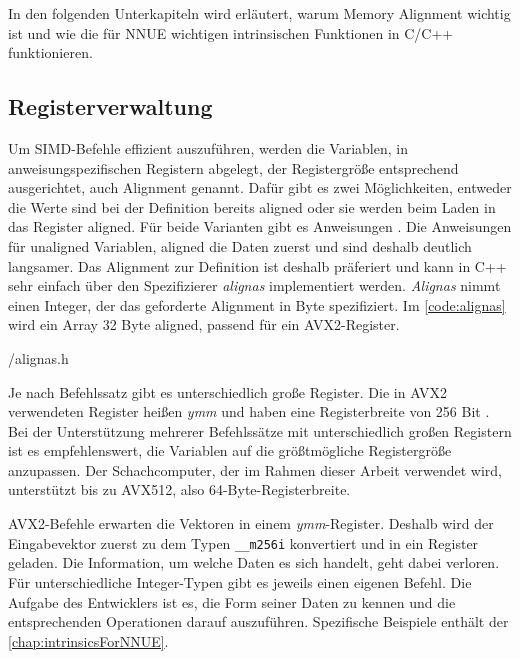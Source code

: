In den folgenden Unterkapiteln wird erläutert, warum Memory Alignment wichtig ist und wie die für \ac{NNUE} wichtigen intrinsischen Funktionen in C/C++ funktionieren.

\subsection{Registerverwaltung}

Um \ac{SIMD}-Befehle effizient auszuführen, werden die Variablen, in anweisungspezifischen Registern abgelegt, der Registergröße entsprechend ausgerichtet, auch Alignment genannt. Dafür gibt es zwei Möglichkeiten, entweder die Werte sind bei der Definition bereits aligned oder sie werden beim Laden in das Register aligned. Für beide Varianten gibt es Anweisungen \cite{intelIntrinsics}. Die Anweisungen für unaligned Variablen, aligned die Daten zuerst und sind deshalb deutlich langsamer. Das Alignment zur Definition ist deshalb präferiert und kann in C++ sehr einfach über den Spezifizierer \emph{alignas} implementiert werden. \emph{Alignas} nimmt einen Integer, der das geforderte Alignment in Byte spezifiziert. Im \autoref{code:alignas} wird ein Array 32 Byte aligned, passend für ein \ac{AVX2}-Register.


{\srcloc/alignas.h}

Je nach Befehlssatz gibt es unterschiedlich große Register. Die in \ac{AVX2} verwendeten Register heißen \emph{ymm} und haben eine Registerbreite von 256 Bit \cite{intelIntrinsics}. Bei der Unterstützung mehrerer Befehlssätze mit unterschiedlich großen Registern ist es empfehlenswert, die Variablen auf die größtmögliche Registergröße anzupassen. Der Schachcomputer, der im Rahmen dieser Arbeit verwendet wird, unterstützt bis zu \ac{AVX512}, also 64-Byte-Registerbreite.

\ac{AVX2}-Befehle erwarten die Vektoren in einem \emph{ymm}-Register. Deshalb wird der Eingabevektor zuerst zu dem Typen \lstinline[language=C++]{__m256i} konvertiert und in ein Register geladen. Die Information, um welche Daten es sich handelt, geht dabei verloren. Für unterschiedliche Integer-Typen gibt es jeweils einen eigenen Befehl. Die Aufgabe des Entwicklers ist es, die Form seiner Daten zu kennen und die entsprechenden Operationen darauf auszuführen. Spezifische Beispiele enthält der \autoref{chap:intrinsicsForNNUE}.

